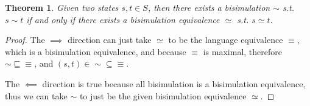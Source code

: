\documentclass{extarticle}
\newtheorem{theorem}{Theorem}
\newtheorem{lemma}[theorem]{Lemma}
\DeclareMathOperator{\norm}{\mathrm{norm}}
\begin{document}
\begin{theorem}\label{thm:bisim-iff-bisim-equiv}
    Given two states \(s, t ∈ S\), then there exists a bisimulation \(∼\) s.t. \(s ∼ t\) if and only if there exists a bisimulation equivalence \(≃\) s.t. \(s ≃ t\).
\end{theorem}

\begin{proof}
    The \(⟹\) direction can just take \(≃\) to be the language equivalence \(≡\), which is a bisimulation equivalence, and because \(≡\) is maximal, therefore \({∼} ⊑ {≡}\), and \((s, t) ∈ {∼} ⊆ {≡}\).

    The \(⟸\) direction is true because all bisimulation is a bisimulation equivalence, thus we can take \(∼\) to just be the given bisimulation equivalence \(≃\).
\end{proof}



    
\end{document}
